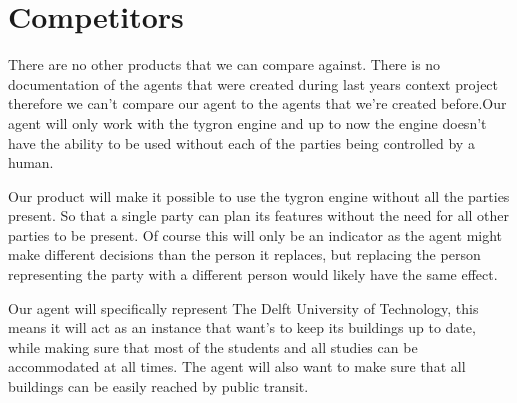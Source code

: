 \section{Competitors}
There are no other products that we can compare against. There is no documentation of the agents that were created during last years context project therefore we can’t compare our agent to the agents that we’re created before.Our agent will only work with the tygron engine and up to now the engine doesn’t have the ability to be used without each of the parties being controlled by a human. 
\par
Our product will make it possible to use the tygron engine without all the parties present. So that a single party can plan its features without the need for all other parties to be present. Of course this will only be an indicator as the agent might make different decisions than the person it replaces, but replacing the person representing the party with a different person would likely have the same effect. 
\par
Our agent will specifically represent The Delft University of Technology, this means it will act as an instance that want’s to keep its buildings up to date, while making sure that most of the students and all studies can be accommodated at all times. The agent will also want to make sure that all buildings can be easily reached by public transit.